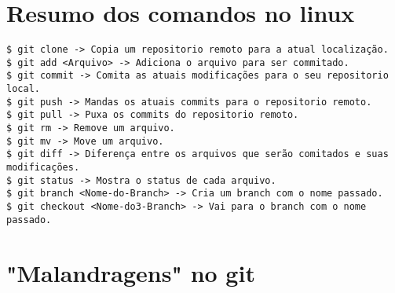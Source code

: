 \documentclass{article}
\begin{document}
\section{Resumo dos comandos no linux}
\begin{tabbing}
\hspace{0.5cm}  \=  \verb#$ git clone -> Copia um repositorio remoto para a atual localização.#\\
                \>  \verb#$ git add <Arquivo> -> Adiciona o arquivo para ser commitado.#\\
                \>  \verb#$ git commit -> Comita as atuais modificações para o seu repositorio local.#\\
                \>  \verb#$ git push -> Mandas os atuais commits para o repositorio remoto.#\\
                \>  \verb#$ git pull -> Puxa os commits do repositorio remoto.#\\
                \>  \verb#$ git rm -> Remove um arquivo.#\\
                \>  \verb#$ git mv -> Move um arquivo.#\\
                \>  \verb#$ git diff -> Diferença entre os arquivos que serão comitados e suas modificações.#\\
                \>  \verb#$ git status -> Mostra o status de cada arquivo.#\\
                \>  \verb#$ git branch <Nome-do-Branch> -> Cria um branch com o nome passado.#\\
                \>  \verb#$ git checkout <Nome-do3-Branch> -> Vai para o branch com o nome passado.#\\
\end{tabbing}

\section{"Malandragens" no git}

\end{document}
